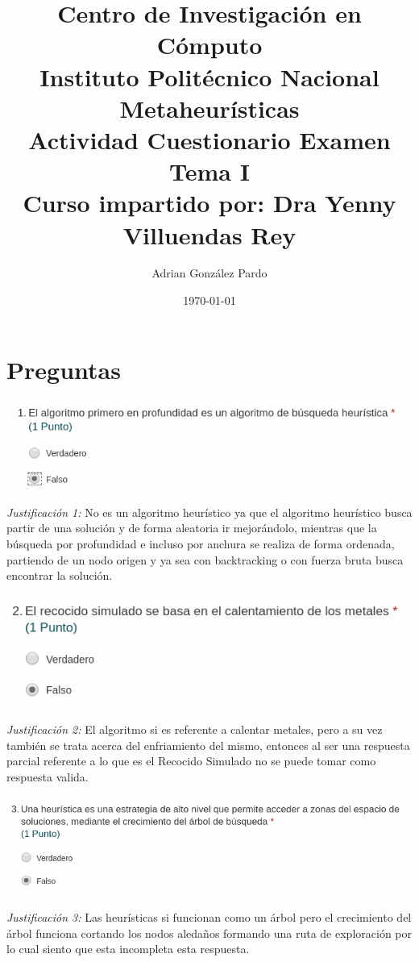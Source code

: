 \documentclass[10pt]{article}
\title{Centro de Investigación en Cómputo\\Instituto Politécnico Nacional\\Metaheurísticas\\Actividad Cuestionario Examen Tema I\\Curso impartido por: Dra Yenny Villuendas Rey}
\author{Adrian González Pardo}
\date{\today}
\begin{document}
\maketitle
\section{Preguntas}
\begin{center}
  \includegraphics[scale=0.5]{img/p1.png}
\end{center}
\textit{Justificación 1: }No es un algoritmo heurístico ya que el algoritmo heurístico busca partir de una solución y de forma aleatoria ir mejorándolo, mientras que la búsqueda por profundidad e incluso por anchura se realiza de forma ordenada, partiendo de un nodo origen y ya sea con backtracking o con fuerza bruta busca encontrar la solución.\\
\begin{center}
  \includegraphics[scale=0.5]{img/p2.png}
\end{center}
\textit{Justificación 2: }El algoritmo si es referente a calentar metales, pero a su vez también se trata acerca del enfriamiento del mismo, entonces al ser una respuesta parcial referente a lo que es el Recocido Simulado no se puede tomar como respuesta valida.\\


\begin{center}
  \includegraphics[scale=0.5]{img/p3.png}
\end{center}
\textit{Justificación 3: }Las heurísticas si funcionan como un árbol pero el crecimiento del árbol funciona cortando los nodos aledaños formando una ruta de exploración por lo cual siento que esta incompleta esta respuesta.\\
\end{document}
